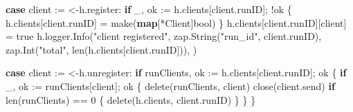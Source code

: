 \documentclass[
]{article}
\newenvironment{Shaded}{}{}
\newcommand{\BuiltInTok}[1]{\textcolor[rgb]{0.00,0.50,0.00}{#1}}
\newcommand{\ControlFlowTok}[1]{\textcolor[rgb]{0.00,0.44,0.13}{\textbf{#1}}}
\newcommand{\DataTypeTok}[1]{\textcolor[rgb]{0.56,0.13,0.00}{#1}}
\newcommand{\DecValTok}[1]{\textcolor[rgb]{0.25,0.63,0.44}{#1}}
\newcommand{\KeywordTok}[1]{\textcolor[rgb]{0.00,0.44,0.13}{\textbf{#1}}}
\newcommand{\NormalTok}[1]{#1}
\newcommand{\OperatorTok}[1]{\textcolor[rgb]{0.40,0.40,0.40}{#1}}
\newcommand{\OtherTok}[1]{\textcolor[rgb]{0.00,0.44,0.13}{#1}}
\newcommand{\StringTok}[1]{\textcolor[rgb]{0.25,0.44,0.63}{#1}}
\begin{document}
\begin{Shaded}
\begin{Highlighting}[]
        \ControlFlowTok{case}\NormalTok{ client }\OperatorTok{:=} \OperatorTok{\textless{}{-}}\NormalTok{h}\OperatorTok{.}\NormalTok{register}\OperatorTok{:}
            \ControlFlowTok{if}\NormalTok{ \_}\OperatorTok{,}\NormalTok{ ok }\OperatorTok{:=}\NormalTok{ h}\OperatorTok{.}\NormalTok{clients}\OperatorTok{[}\NormalTok{client}\OperatorTok{.}\NormalTok{runID}\OperatorTok{];} \OperatorTok{!}\NormalTok{ok }\OperatorTok{\{}
\NormalTok{                h}\OperatorTok{.}\NormalTok{clients}\OperatorTok{[}\NormalTok{client}\OperatorTok{.}\NormalTok{runID}\OperatorTok{]} \OperatorTok{=} \BuiltInTok{make}\OperatorTok{(}\KeywordTok{map}\OperatorTok{[*}\NormalTok{Client}\OperatorTok{]}\DataTypeTok{bool}\OperatorTok{)}
            \OperatorTok{\}}
\NormalTok{            h}\OperatorTok{.}\NormalTok{clients}\OperatorTok{[}\NormalTok{client}\OperatorTok{.}\NormalTok{runID}\OperatorTok{][}\NormalTok{client}\OperatorTok{]} \OperatorTok{=} \OtherTok{true}
\NormalTok{            h}\OperatorTok{.}\NormalTok{logger}\OperatorTok{.}\NormalTok{Info}\OperatorTok{(}\StringTok{"client registered"}\OperatorTok{,}
\NormalTok{                zap}\OperatorTok{.}\NormalTok{String}\OperatorTok{(}\StringTok{"run\_id"}\OperatorTok{,}\NormalTok{ client}\OperatorTok{.}\NormalTok{runID}\OperatorTok{),}
\NormalTok{                zap}\OperatorTok{.}\NormalTok{Int}\OperatorTok{(}\StringTok{"total"}\OperatorTok{,} \BuiltInTok{len}\OperatorTok{(}\NormalTok{h}\OperatorTok{.}\NormalTok{clients}\OperatorTok{[}\NormalTok{client}\OperatorTok{.}\NormalTok{runID}\OperatorTok{])),}
            \OperatorTok{)}

        \ControlFlowTok{case}\NormalTok{ client }\OperatorTok{:=} \OperatorTok{\textless{}{-}}\NormalTok{h}\OperatorTok{.}\NormalTok{unregister}\OperatorTok{:}
            \ControlFlowTok{if}\NormalTok{ runClients}\OperatorTok{,}\NormalTok{ ok }\OperatorTok{:=}\NormalTok{ h}\OperatorTok{.}\NormalTok{clients}\OperatorTok{[}\NormalTok{client}\OperatorTok{.}\NormalTok{runID}\OperatorTok{];}\NormalTok{ ok }\OperatorTok{\{}
                \ControlFlowTok{if}\NormalTok{ \_}\OperatorTok{,}\NormalTok{ ok }\OperatorTok{:=}\NormalTok{ runClients}\OperatorTok{[}\NormalTok{client}\OperatorTok{];}\NormalTok{ ok }\OperatorTok{\{}
                    \BuiltInTok{delete}\OperatorTok{(}\NormalTok{runClients}\OperatorTok{,}\NormalTok{ client}\OperatorTok{)}
                    \BuiltInTok{close}\OperatorTok{(}\NormalTok{client}\OperatorTok{.}\NormalTok{send}\OperatorTok{)}
                    \ControlFlowTok{if} \BuiltInTok{len}\OperatorTok{(}\NormalTok{runClients}\OperatorTok{)} \OperatorTok{==} \DecValTok{0} \OperatorTok{\{}
                        \BuiltInTok{delete}\OperatorTok{(}\NormalTok{h}\OperatorTok{.}\NormalTok{clients}\OperatorTok{,}\NormalTok{ client}\OperatorTok{.}\NormalTok{runID}\OperatorTok{)}
                    \OperatorTok{\}}
                \OperatorTok{\}}
            \OperatorTok{\}}


\end{Highlighting}
\end{Shaded}
\end{document}
